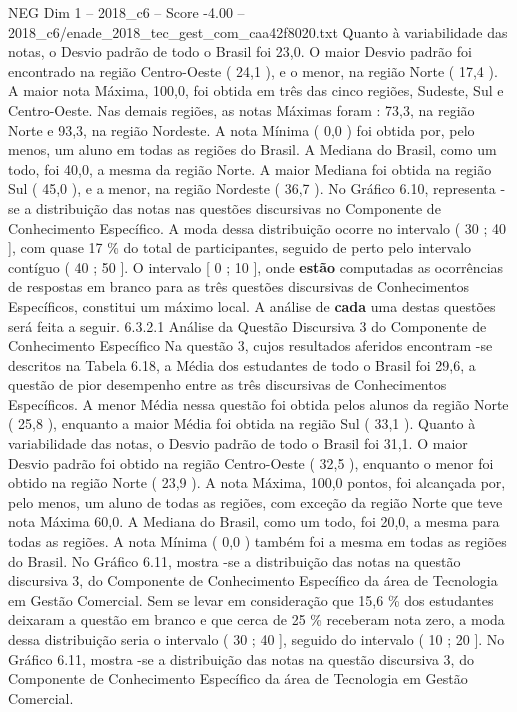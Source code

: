 \begin{textsample}{NEG Dim 1 – 2018\_c6 – Score -4.00 – 2018\_c6/enade\_2018\_tec\_gest\_com\_caa42f8020.txt}
Quanto à variabilidade das notas, o Desvio padrão de todo o Brasil foi 23,0.
O maior Desvio padrão foi encontrado na região Centro-Oeste ( 24,1 ), e o menor, na região Norte ( 17,4 ).
A maior nota Máxima, 100,0, foi obtida em três das cinco regiões, Sudeste, Sul e Centro-Oeste.
Nas demais regiões, as notas Máximas foram : 73,3, na região Norte e 93,3, na região Nordeste.
A nota Mínima ( 0,0 ) foi obtida por, pelo menos, um aluno em todas as regiões do Brasil.
A Mediana do Brasil, como um todo, foi 40,0, a mesma da região Norte.
A maior Mediana foi obtida na região Sul ( 45,0 ), e a menor, na região Nordeste ( 36,7 ).
No Gráfico 6.10, representa -se a distribuição das notas nas questões discursivas no Componente de Conhecimento Específico.
A moda dessa distribuição ocorre no intervalo ( 30 ; 40 ], com quase 17 \% do total de participantes, seguido de perto pelo intervalo contíguo ( 40 ; 50 ].
O intervalo [ 0 ; 10 ], onde \textbf{estão} computadas as ocorrências de respostas em branco para as três questões discursivas de Conhecimentos Específicos, constitui um máximo local.
A análise de \textbf{cada} uma destas questões será feita a seguir. 6.3.2.1 Análise da Questão Discursiva 3 do Componente de Conhecimento Específico Na questão 3, cujos resultados aferidos encontram -se descritos na Tabela 6.18, a Média dos estudantes de todo o Brasil foi 29,6, a questão de pior desempenho entre as três discursivas de Conhecimentos Específicos.
A menor Média nessa questão foi obtida pelos alunos da região Norte ( 25,8 ), enquanto a maior Média foi obtida na região Sul ( 33,1 ).
Quanto à variabilidade das notas, o Desvio padrão de todo o Brasil foi 31,1.
O maior Desvio padrão foi obtido na região Centro-Oeste ( 32,5 ), enquanto o menor foi obtido na região Norte ( 23,9 ).
A nota Máxima, 100,0 pontos, foi alcançada por, pelo menos, um aluno de todas as regiões, com exceção da região Norte que teve nota Máxima 60,0.
A Mediana do Brasil, como um todo, foi 20,0, a mesma para todas as regiões.
A nota Mínima ( 0,0 ) também foi a mesma em todas as regiões do Brasil.
No Gráfico 6.11, mostra -se a distribuição das notas na questão discursiva 3, do Componente de Conhecimento Específico da área de Tecnologia em Gestão Comercial.
Sem se levar em consideração que 15,6 \% dos estudantes deixaram a questão em branco e que cerca de 25 \% receberam nota zero, a moda dessa distribuição seria o intervalo ( 30 ; 40 ], seguido do intervalo ( 10 ; 20 ].
No Gráfico 6.11, mostra -se a distribuição das notas na questão discursiva 3, do Componente de Conhecimento Específico da área de Tecnologia em Gestão Comercial.

\end{textsample}
